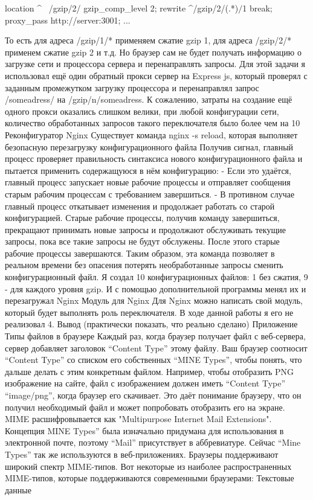 \documentclass[12pt]{article}
\begin{document}
    location ^~ /gzip/2/ {
    gzip_comp_level 2;
    rewrite ^/gzip/2/(.*)$ /$1 break;
proxy_pass http://server:3001;
}
...

То есть для адреса /gzip/1/* применяем сжатие gzip 1, для адреса /gzip/2/* применем сжатие gzip 2 и т.д. Но браузер сам не будет получать информацию о загрузке сети и процессора сервера и перенаправлять запросы. Для этой задачи я использовал ещё один обратный прокси сервер на Express js, который проверял с заданным промежутком загрузку процессора и перенаправлял запрос /someadress/ на /gzip/n/someadress.
К сожалению, затраты на создание ещё одного прокси оказались слишком велики, при любой конфигурации сети, количество обработанных запросов такого переключателя было более чем на 10%
Реконфигуратор Nginx
Существует команда nginx -s reload, которая выполняет безопасную перезагрузку конфигурационного файла
Получив сигнал, главный процесс проверяет правильность синтаксиса нового конфигурационного файла и пытается применить содержащуюся в нём конфигурацию:
- Если это удаётся, главный процесс запускает новые рабочие процессы и отправляет сообщения старым рабочим процессам с требованием завершиться.
- В противном случае главный процесс откатывает изменения и продолжает работать со старой конфигурацией.
Старые рабочие процессы, получив команду завершиться, прекращают принимать новые запросы и продолжают обслуживать текущие запросы, пока все такие запросы не будут обслужены. После этого старые рабочие процессы завершаются.
Таким образом, эта команда позволяет в реальном времени без опасения потерять необработанные запросы сменить конфигурационный файл. Я создал 10 конфигурационных файлов: 1 без сжатия, 9 - для каждого уровня gzip. И с помощью дополнительной программы менял их и перезагружал Nginx
Модуль для Nginx
Для Nginx можно написать свой модуль, который будет выполнять роль переключателя. В ходе данной работы я его не реализовал
4. Вывод (практически показать, что реально сделано)
Приложение
Типы файлов в браузере
Каждый раз, когда браузер получает файл с веб-сервера, сервер добавляет заголовок “Content Type” этому файлу. Ваш браузер соотносит “Content Type” со списком его собственных “MINE Types”, чтобы понять, что дальше делать с этим конкретным файлом.
Например, чтобы отобразить PNG изображение на сайте, файл с изображением должен иметь “Content Type” “image/png”, когда браузер его скачивает. Это даёт понимание браузеру, что он получил необходимый файл и может попробовать отобразить его на экране.
MIME расшифровывается как "Multipurpose Internet Mail Extensions". Концепция MINE Types” была изначально придумана для использования в электронной почте, поэтому “Mail” присутствует в аббревиатуре. Сейчас “Mine Types” так же используются в веб-приложениях.
Браузеры поддерживают широкий спектр MIME-типов. Вот некоторые из наиболее распространенных MIME-типов, которые поддерживаются современными браузерами:
Текстовые данные
\end{document}
